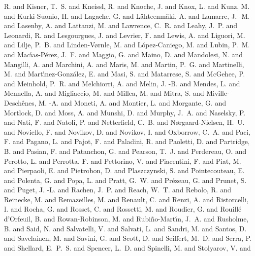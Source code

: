 {{        R. and {Kisner}, T.~S. and {Kneissl}, R. and {Knoche}, J. and
        {Knox}, L. and {Kunz}, M. and {Kurki-Suonio}, H. and {Lagache},
        G. and {L{\"a}hteenm{\"a}ki}, A. and {Lamarre}, J. -M. and
        {Lasenby}, A. and {Lattanzi}, M. and {Lawrence}, C.~R. and
        {Leahy}, J.~P. and {Leonardi}, R. and {Lesgourgues}, J. and
        {Levrier}, F. and {Lewis}, A. and {Liguori}, M. and {Lilje},
        P.~B. and {Linden-V{\o}rnle}, M. and {L{\'o}pez-Caniego}, M. and
        {Lubin}, P.~M. and {Mac{\'\i}as-P{\'e}rez}, J.~F. and {Maggio},
        G. and {Maino}, D. and {Mandolesi}, N. and {Mangilli}, A. and
        {Marchini}, A. and {Maris}, M. and {Martin}, P.~G. and
        {Martinelli}, M. and {Mart{\'\i}nez-Gonz{\'a}lez}, E. and
        {Masi}, S. and {Matarrese}, S. and {McGehee}, P. and {Meinhold},
        P.~R. and {Melchiorri}, A. and {Melin}, J. -B. and {Mendes}, L.
        and {Mennella}, A. and {Migliaccio}, M. and {Millea}, M. and
        {Mitra}, S. and {Miville-Desch{\^e}nes}, M. -A. and {Moneti}, A.
        and {Montier}, L. and {Morgante}, G. and {Mortlock}, D. and
        {Moss}, A. and {Munshi}, D. and {Murphy}, J.~A. and {Naselsky},
        P. and {Nati}, F. and {Natoli}, P. and {Netterfield}, C.~B. and
        {N{\o}rgaard-Nielsen}, H.~U. and {Noviello}, F. and {Novikov},
        D. and {Novikov}, I. and {Oxborrow}, C.~A. and {Paci}, F. and
        {Pagano}, L. and {Pajot}, F. and {Paladini}, R. and {Paoletti},
        D. and {Partridge}, B. and {Pasian}, F. and {Patanchon}, G. and
        {Pearson}, T.~J. and {Perdereau}, O. and {Perotto}, L. and
        {Perrotta}, F. and {Pettorino}, V. and {Piacentini}, F. and
        {Piat}, M. and {Pierpaoli}, E. and {Pietrobon}, D. and
        {Plaszczynski}, S. and {Pointecouteau}, E. and {Polenta}, G. and
        {Popa}, L. and {Pratt}, G.~W. and {Pr{\'e}zeau}, G. and
        {Prunet}, S. and {Puget}, J. -L. and {Rachen}, J.~P. and
        {Reach}, W.~T. and {Rebolo}, R. and {Reinecke}, M. and
        {Remazeilles}, M. and {Renault}, C. and {Renzi}, A. and
        {Ristorcelli}, I. and {Rocha}, G. and {Rosset}, C. and
        {Rossetti}, M. and {Roudier}, G. and {Rouill{\'e} d'Orfeuil}, B.
        and {Rowan-Robinson}, M. and {Rubi{\~n}o-Mart{\'\i}n}, J.~A. and
        {Rusholme}, B. and {Said}, N. and {Salvatelli}, V. and
        {Salvati}, L. and {Sandri}, M. and {Santos}, D. and
        {Savelainen}, M. and {Savini}, G. and {Scott}, D. and
        {Seiffert}, M.~D. and {Serra}, P. and {Shellard}, E.~P.~S. and
        {Spencer}, L.~D. and {Spinelli}, M. and {Stolyarov}, V. and
}}
